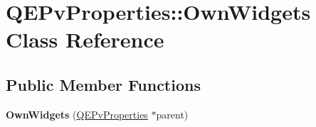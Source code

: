 \hypertarget{classQEPvProperties_1_1OwnWidgets}{
\section{QEPvProperties::OwnWidgets Class Reference}
\label{classQEPvProperties_1_1OwnWidgets}
}
\subsection*{Public Member Functions}
\begin{DoxyCompactItemize}
\item 
\hypertarget{classQEPvProperties_1_1OwnWidgets_ad40480cd4a09f4b275c5c41520d6cb40}{
{\bfseries OwnWidgets} (\hyperlink{classQEPvProperties}{QEPvProperties} $\ast$parent)}
\label{classQEPvProperties_1_1OwnWidgets_ad40480cd4a09f4b275c5c41520d6cb40}

\end{DoxyCompactItemize}
